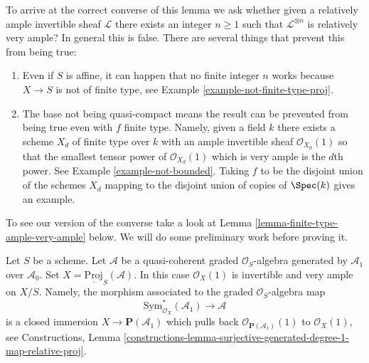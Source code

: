 \noindent
To arrive at the correct converse of this lemma we ask
whether given a relatively ample
invertible sheaf $\mathcal{L}$ there exists an integer $n \geq 1$ such
that $\mathcal{L}^{\otimes n}$ is relatively very ample? In general this
is false. There are several things that prevent this from being true:
\begin{enumerate}
\item Even if $S$ is affine, it can happen that no finite integer
$n$ works because $X \to S$ is not of finite type, see
Example \ref{example-not-finite-type-proj}.
\item The base not being quasi-compact means the result can be
prevented from being true even with $f$ finite type. Namely, given
a field $k$ there exists a scheme $X_d$ of finite type over $k$ with
an ample invertible sheaf $\mathcal{O}_{X_d}(1)$ so that the smallest
tensor power of $\mathcal{O}_{X_d}(1)$ which is very ample is the $d$th
power. See Example \ref{example-not-bounded}.
Taking $f$ to be the disjoint union of the schemes $X_d$ mapping
to the disjoint union of copies of $\Spec(k)$ gives an example.
\end{enumerate}
To see our version of the converse take a look at
Lemma \ref{lemma-finite-type-ample-very-ample} below.
We will do some preliminary work before proving it.

\begin{example}
\label{example-very-ample}
Let $S$ be a scheme. Let $\mathcal{A}$ be a quasi-coherent graded
$\mathcal{O}_S$-algebra generated by $\mathcal{A}_1$ over $\mathcal{A}_0$.
Set $X = \underline{\text{Proj}}_S(\mathcal{A})$. In this case
$\mathcal{O}_X(1)$ is invertible and very ample on $X/S$. Namely,
the morphism associated to the graded $\mathcal{O}_S$-algebra map
$$
\text{Sym}_{\mathcal{O}_X}^*(\mathcal{A}_1)
\longrightarrow
\mathcal{A}
$$
is a closed immersion $X \to \mathbf{P}(\mathcal{A}_1)$ which pulls back
$\mathcal{O}_{\mathbf{P}(\mathcal{A}_1)}(1)$ to $\mathcal{O}_X(1)$, see
Constructions, Lemma
\ref{constructions-lemma-surjective-generated-degree-1-map-relative-proj}.
\end{example}

